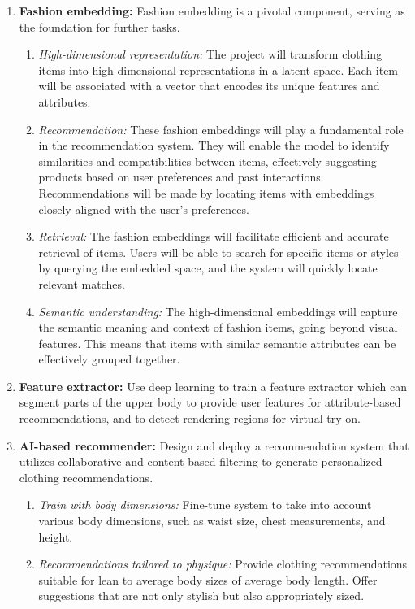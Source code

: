 		\begin{enumerate}
			\item \textbf{Fashion embedding:} Fashion embedding is a pivotal component, serving as the foundation for further tasks.
				\begin{enumerate}
					\item \textit{High-dimensional representation:} The project will transform clothing items into high-dimensional representations in a latent space. Each item will be associated with a vector that encodes its unique features and attributes.
					\item \textit{Recommendation:} These fashion embeddings will play a fundamental role in the recommendation system. They will enable the model to identify similarities and compatibilities between items, effectively suggesting products based on user preferences and past interactions. Recommendations will be made by locating items with embeddings closely aligned with the user's preferences.
					\item \textit{Retrieval:} The fashion embeddings will facilitate efficient and accurate retrieval of items. Users will be able to search for specific items or styles by querying the embedded space, and the system will quickly locate relevant matches.
					\item \textit{Semantic understanding:} The high-dimensional embeddings will capture the semantic meaning and context of fashion items, going beyond visual features. This means that items with similar semantic attributes can be effectively grouped together.
				\end{enumerate}
			\item \textbf{Feature extractor:} Use deep learning to train a feature extractor which can segment parts of the upper body to provide user features for attribute-based recommendations, and to detect rendering regions for virtual try-on.
			\item \textbf{AI-based recommender:} Design and deploy a recommendation system that utilizes collaborative and content-based filtering to generate personalized clothing recommendations.
				\begin{enumerate}
					\item \textit{Train with body dimensions:} Fine-tune system to take into account various body dimensions, such as waist size, chest measurements, and height.
					\item \textit{Recommendations tailored to physique:} Provide clothing recommendations suitable for lean to average body sizes of average body length. Offer suggestions that are not only stylish but also appropriately sized.

\end{enumerate}
\end{enumerate}
